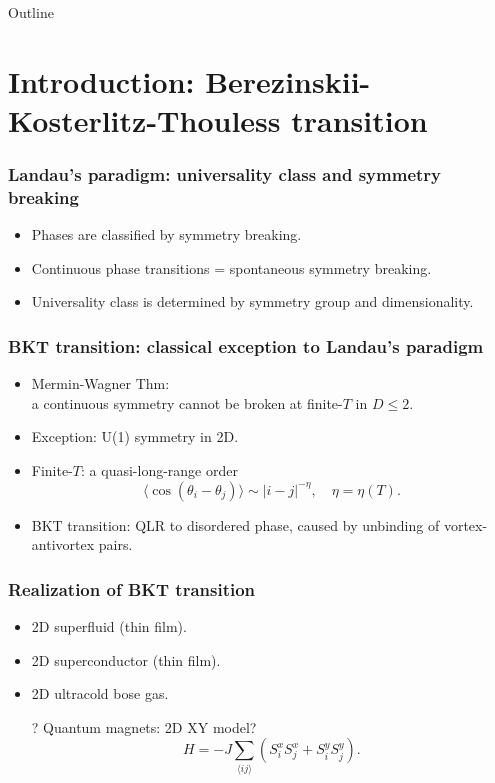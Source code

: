 \documentclass[xcolor=table, aspectratio=1610,ignorenonframetext]{beamer}
\begin{document}
\begin{frame}{Outline}
		\tableofcontents
\end{frame}

\section{Introduction: Berezinskii-Kosterlitz-Thouless transition}

\begin{frame}
	\frametitle{Landau's paradigm: universality class and symmetry breaking}
	\begin{itemize}
		\item Phases are classified by symmetry breaking.
		\item Continuous phase transitions = spontaneous symmetry breaking.
		\item Universality class is determined by symmetry group and dimensionality.
	\end{itemize}
\end{frame}

\begin{frame}
	\frametitle{BKT transition: classical exception to Landau's paradigm}
	\begin{itemize}
		\item Mermin-Wagner Thm:\\a continuous symmetry cannot be broken at finite-$T$ in $D\leq2$.
		\item Exception: U(1) symmetry in 2D.
    \item Finite-$T$: a quasi-long-range order
    \[\langle \cos(\theta_i-\theta_j)\rangle\sim |i-j|^{-\eta},\quad \eta=\eta(T).\]
    \item BKT transition: QLR to disordered phase, caused by unbinding of vortex-antivortex pairs.
	\end{itemize}
\end{frame}

\begin{frame}
	\frametitle{Realization of BKT transition}
	\begin{itemize}
		\item 2D superfluid (thin film).
		\item 2D superconductor (thin film).
		\item 2D ultracold bose gas.
		\item[?] Quantum magnets: 2D XY model?
		\[H=-J\sum_{\langle ij\rangle}\left(S_i^xS_j^x + S_i^yS_j^y\right).\]
	\end{itemize}
\end{frame}
\end{document}
